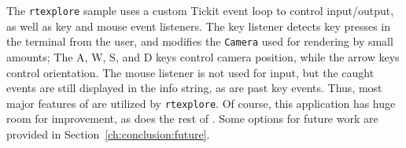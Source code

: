 The \texttt{rtexplore} sample uses a custom Tickit event loop to control input/output, as well as key and mouse event listeners.
The key listener detects key presses in the terminal from the user, and modifies the \texttt{Camera} used for rendering by small amounts;
The A, W, S, and D keys control camera position, while the arrow keys control orientation.
The mouse listener is not used for input, but the caught events are still displayed in the info string, as are past key events.
Thus, most major features of \name{} are utilized by \texttt{rtexplore}.
Of course, this application has huge room for improvement, as does the rest of \name{}.
Some options for future work are provided in Section~\ref{ch:conclusion:future}.
